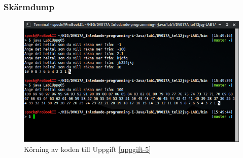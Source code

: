 \subsubsection{Skärmdump}
\begin{figure}[htbp]
    \centering
        \includegraphics[width=\linewidth]{img/05.png}
    \caption{Körning av koden till Uppgift \ref{uppgift-5}}
    \label{fig:screenshot-05}
\end{figure}
